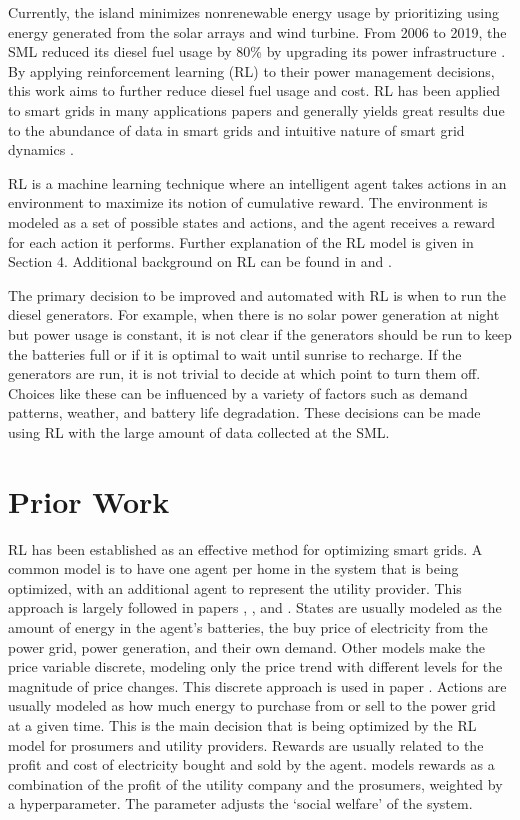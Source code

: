 \documentclass{article}
\begin{document}
Currently, the island minimizes nonrenewable energy usage by prioritizing using energy generated from the solar arrays and wind turbine. From 2006 to 2019, the SML reduced its diesel fuel usage by 80\% by upgrading its power infrastructure \cite{smlwebsite}. By applying reinforcement learning (RL) to their power management decisions, this work aims to further reduce diesel fuel usage and cost. RL has been applied to smart grids in many applications papers and generally yields great results due to the abundance of data in smart grids and intuitive nature of smart grid dynamics \cite{review}.

RL is a machine learning technique where an intelligent agent takes actions in an environment to maximize its notion of cumulative reward. The environment is modeled as a set of possible states and actions, and the agent receives a reward for each action it performs. Further explanation of the RL model is given in Section 4. Additional background on RL can be found in \cite{suttonbarto} and \cite{bertsekas}.

The primary decision to be improved and automated with RL is when to run the diesel generators. For example, when there is no solar power generation at night but power usage is constant, it is not clear if the generators should be run to keep the batteries full or if it is optimal to wait until sunrise to recharge. If the generators are run, it is not trivial to decide at which point to turn them off. Choices like these can be influenced by a variety of factors such as demand patterns, weather, and battery life degradation. These decisions can be made using RL with the large amount of data collected at the SML.


\section{Prior Work}
RL has been established as an effective method for optimizing smart grids. A common model is to have one agent per home in the system that is being optimized, with an additional agent to represent the utility provider. This approach is largely followed in papers \cite{socialwelfare}, \cite{multiagent}, and \cite{fqi}.  States are usually modeled as the amount of energy in the agent's batteries, the buy price of electricity from the power grid, power generation, and their own demand. Other models make the price variable discrete, modeling only the price trend with different levels for the magnitude of price changes. This discrete approach is used in paper \cite{fqi}. Actions are usually modeled as how much energy to purchase from or sell to the power grid at a given time. This is the main decision that is being optimized by the RL model for prosumers and utility providers. Rewards are usually related to the profit and cost of electricity bought and sold by the agent. \cite{socialwelfare} models rewards as a combination of the profit of the utility company and the prosumers, weighted by a hyperparameter. The parameter adjusts the `social welfare' of the system.
\end{document}
